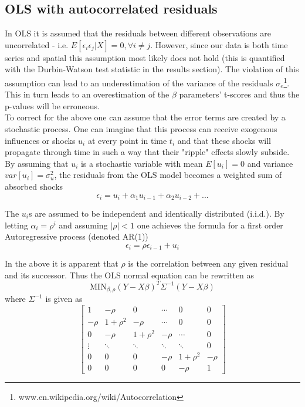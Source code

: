 
\subsection{OLS with autocorrelated residuals}

In OLS it is assumed that the residuals between different observations are uncorrelated - i.e. $E[\epsilon_i \epsilon_j | X]=0, \forall i \neq j$. 
However, since our data is both time series and spatial this assumption most likely does not hold (this is quantified with the Durbin-Watson test statistic in the results section). 
The violation of this assumption can lead to an underestimation of the variance of the residuals $\sigma_e$\footnote{www.en.wikipedia.org/wiki/Autocorrelation}.
 This in turn leads to an overestimation of the $\beta$ parameters' t-scores and thus the p-values will be erroneous. 
\\
To correct for the above one can assume that the error terms are created by a stochastic process. 
One can imagine that this process can receive exogenous influences or shocks $u_i$ at every point in time $t_i$ and that these shocks will propagate through time in such a way that their "ripple" effects slowly subside.
By assuming that $u_i$ is a stochastic variable with mean $E[u_i]=0$ and variance $var[u_i]=\sigma_u^2$, the residuals from the OLS model becomes a weighted sum of absorbed shocks 
\begin{equation}
\epsilon_i=u_i+\alpha_1 u_{i-1}+\alpha_2 u_{i-2}+...
\end{equation}

 The $u_i$s are assumed to be independent and identically distributed (i.i.d.).
By letting $\alpha_i=\rho^i$ and assuming $|\rho|<1$ one achieves the formula for a first order Autoregressive process (denoted AR(1))
\begin{equation}
\epsilon_i=\rho \epsilon_{i-1}+u_i
\end{equation}

In the above it is apparent that $\rho$ is the correlation between any given residual and its successor. 
Thus the OLS normal equation can be rewritten as
\begin{equation}\label{olsAR}
\text{MIN}_{\beta,\rho} (Y-X\beta)^T \Sigma^{-1}(Y-X\beta)
\end{equation}
 where $ \Sigma^{-1}$ is given as
\begin{equation}
\begin{bmatrix}
1 & -\rho & 0 & \cdots & 0 & 0\\
-\rho & 1+\rho^2 & -\rho & \cdots & 0 & 0\\
0 & -\rho & 1+\rho^2 & -\rho &\cdots & 0  \\
\vdots &\ddots & \ddots & \ddots & \ddots & 0 \\
0 & 0 &0& -\rho & 1+\rho^2 & -\rho  \\
0 & 0 &0&0&-\rho & 1
\end{bmatrix}
\end{equation}

